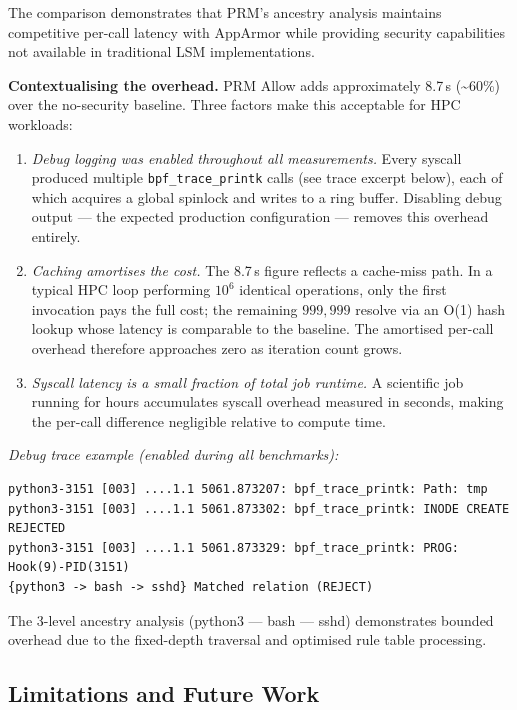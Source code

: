 \documentclass[]{sn-jnl}
\begin{document}
The comparison demonstrates that PRM's ancestry analysis maintains competitive
per-call latency with AppArmor while providing security capabilities not
available in traditional LSM implementations.

\textbf{Contextualising the overhead.}
PRM Allow adds approximately 8.7\,\textmu s (\textasciitilde60\%) over the
no-security baseline. Three factors make this acceptable for HPC workloads:
\begin{enumerate}
\item \emph{Debug logging was enabled throughout all measurements.} Every syscall
      produced multiple \texttt{bpf\_trace\_printk} calls (see trace excerpt
      below), each of which acquires a global spinlock and writes to a ring
      buffer. Disabling debug output --- the expected production configuration ---
      removes this overhead entirely.
\item \emph{Caching amortises the cost.} The 8.7\,\textmu s figure reflects a
      cache-miss path. In a typical HPC loop performing $10^{6}$ identical
      operations, only the first invocation pays the full cost; the remaining
      $999{,}999$ resolve via an O(1) hash lookup whose latency is comparable to
      the baseline. The amortised per-call overhead therefore approaches zero as
      iteration count grows.
\item \emph{Syscall latency is a small fraction of total job runtime.} A
      scientific job running for hours accumulates syscall overhead measured in
      seconds, making the per-call difference negligible relative to compute time.
\end{enumerate}

\emph{Debug trace example (enabled during all benchmarks):}
\begin{lstlisting}[basicstyle=\scriptsize\ttfamily, frame=single, backgroundcolor=\color{gray!10}]
python3-3151 [003] ....1.1 5061.873207: bpf_trace_printk: Path: tmp
python3-3151 [003] ....1.1 5061.873302: bpf_trace_printk: INODE CREATE REJECTED
python3-3151 [003] ....1.1 5061.873329: bpf_trace_printk: PROG: Hook(9)-PID(3151)
{python3 -> bash -> sshd} Matched relation (REJECT)
\end{lstlisting}

The 3-level ancestry analysis (python3 --- bash --- sshd) demonstrates bounded
overhead due to the fixed-depth traversal and optimised rule table processing.

\subsection{Limitations and Future Work}
\end{document}
